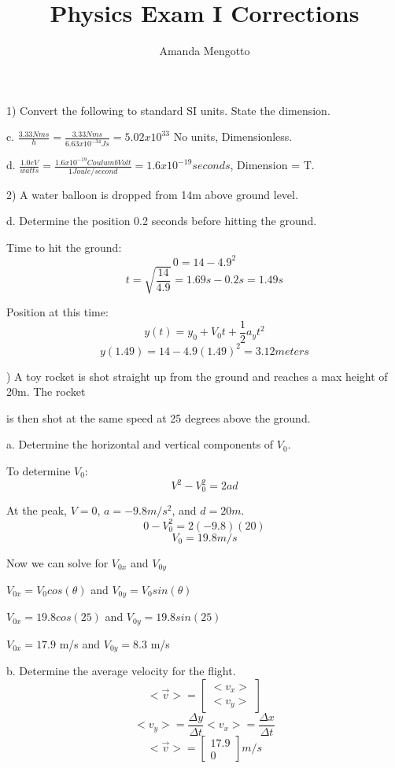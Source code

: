 \documentclass{article}
\begin{document}
\title{Physics Exam I Corrections}
\author{Amanda Mengotto}
\maketitle

1) Convert the following to standard SI units. State the dimension.

c. $\frac{3.33 Nms}{h} = \frac{3.33 Nms}{6.63 x 10^{-34} Js} = 5.02 x 10^{33}$ No units, Dimensionless. 

d. $\frac{1.0eV}{watts} = \frac{1.6 x 10^{-19} Coulumb Volt}{1 Joule/second} = 1.6 x 10^{-19} seconds$, Dimension = T.

\bigskip

2) A water balloon is dropped from 14m above ground level.

d. Determine the position 0.2 seconds before hitting the ground. 

Time to hit the ground: 
\[0 = 14-4.9^2\]
\[t = \sqrt{\frac{14}{4.9}} = 1.69s - 0.2s = 1.49s\]

Position at this time:
\[ y(t) = y_0 + V_{0}t + \frac{1}{2} a_y t^2 \]
\[y(1.49) = 14 - 4.9(1.49)^2 = 3.12 meters\]

) A toy rocket is shot straight up from the ground and reaches a max height of 20m. The rocket  \par is then shot at the same speed at 25 degrees above the ground. 

a. Determine the horizontal and vertical components of $V_0$. 

To determine $V_0$:
\[ V^2 - V_0^2 = 2ad\]
\par At the peak, $V = 0$, $a = -9.8m/s^2$, and $d=20m$.
\[0-V_0^2 = 2(-9.8)(20)\]
\[V_0 = 19.8 m/s\]

\par Now we can solve for $V_{0x}$ and $V_{0y}$
\begin{center}
$V_{0x} = V_0 cos(\theta)$    and   $V_{0y} = V_0 sin(\theta)$

$V_{0x} = 19.8 cos(25)$    and   $V_{0y} = 19.8 sin(25)$

$V_{0x} = 17.9 $ m/s    and   $V_{0y} = 8.3 $ m/s
\end{center}

b. Determine the average velocity for the flight.
\[<\vec{v}> = \begin{bmatrix} <v_x> \\ <v_y> \end{bmatrix} \]
\[<v_y> = \frac{\Delta y}{\Delta t} <v_x> = \frac{\Delta x}{\Delta t} \]
\[<\vec{v}> = \begin{bmatrix} 17.9 \\ 0 \end{bmatrix} m/s\]
\end{document}
